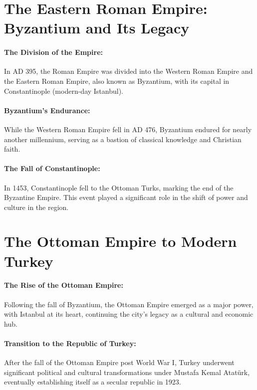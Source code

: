 \documentclass[a4paper,12pt]{book}
\begin{document}
\section*{The Eastern Roman Empire: Byzantium and Its Legacy}

\paragraph{The Division of the Empire:}
In AD 395, the Roman Empire was divided into the Western Roman Empire and the Eastern Roman Empire, also known as Byzantium, with its capital in Constantinople (modern-day Istanbul).

\paragraph{Byzantium’s Endurance:}
While the Western Roman Empire fell in AD 476, Byzantium endured for nearly another millennium, serving as a bastion of classical knowledge and Christian faith.

\paragraph{The Fall of Constantinople:}
In 1453, Constantinople fell to the Ottoman Turks, marking the end of the Byzantine Empire. This event played a significant role in the shift of power and culture in the region.

\section*{The Ottoman Empire to Modern Turkey}

\paragraph{The Rise of the Ottoman Empire:}
Following the fall of Byzantium, the Ottoman Empire emerged as a major power, with Istanbul at its heart, continuing the city’s legacy as a cultural and economic hub.

\paragraph{Transition to the Republic of Turkey:}
After the fall of the Ottoman Empire post World War I, Turkey underwent significant political and cultural transformations under Mustafa Kemal Atatürk, eventually establishing itself as a secular republic in 1923.
\end{document}
